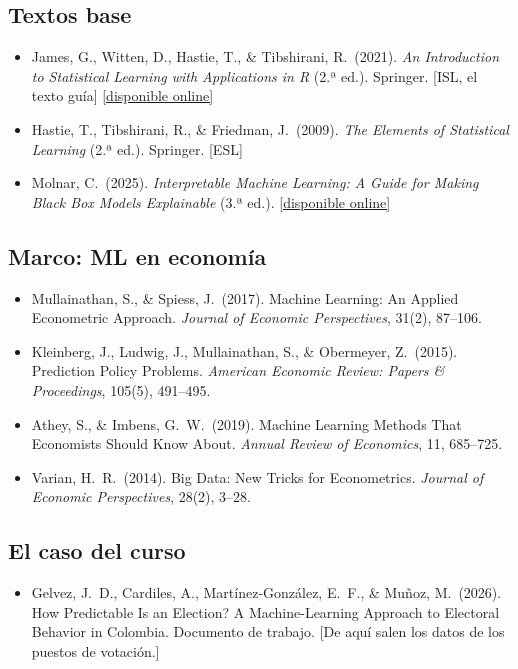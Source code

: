 \documentclass[12pt,a4paper]{article}
\begin{document}
\subsection*{Textos base}
\begin{itemize}
    \item James, G., Witten, D., Hastie, T., \& Tibshirani, R.\ (2021). \textit{An Introduction to Statistical Learning with Applications in R} (2.ª ed.). Springer. [ISL, el texto guía] \href{https://www.statlearning.com}{[disponible online]}
    \item Hastie, T., Tibshirani, R., \& Friedman, J.\ (2009). \textit{The Elements of Statistical Learning} (2.ª ed.). Springer. [ESL]
    \item Molnar, C.\ (2025). \textit{Interpretable Machine Learning: A Guide for Making Black Box Models Explainable} (3.ª ed.). \href{https://christophm.github.io/interpretable-ml-book/}{[disponible online]}
\end{itemize}

\subsection*{Marco: ML en economía}
\begin{itemize}
    \item Mullainathan, S., \& Spiess, J.\ (2017). Machine Learning: An Applied Econometric Approach. \textit{Journal of Economic Perspectives}, 31(2), 87--106.
    \item Kleinberg, J., Ludwig, J., Mullainathan, S., \& Obermeyer, Z.\ (2015). Prediction Policy Problems. \textit{American Economic Review: Papers \& Proceedings}, 105(5), 491--495.
    \item Athey, S., \& Imbens, G.\ W.\ (2019). Machine Learning Methods That Economists Should Know About. \textit{Annual Review of Economics}, 11, 685--725.
    \item Varian, H.\ R.\ (2014). Big Data: New Tricks for Econometrics. \textit{Journal of Economic Perspectives}, 28(2), 3--28.
\end{itemize}

\subsection*{El caso del curso}
\begin{itemize}
    \item Gelvez, J.\ D., Cardiles, A., Martínez-González, E.\ F., \& Muñoz, M.\ (2026). How Predictable Is an Election? A Machine-Learning Approach to Electoral Behavior in Colombia. Documento de trabajo. [De aquí salen los datos de los puestos de votación.]
\end{itemize}
\end{document}
